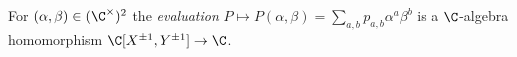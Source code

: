 For $(\alpha,\beta)\in(\C^\times)^2$ the \emph{evaluation} $P\mapsto P(\alpha,\beta)=\sum_{a,b}p_{a,b}\alpha^a\beta^b$ is a $\C$-algebra homomorphism $\C[X^{\pm1},Y^{\pm1}]\to\C$.
